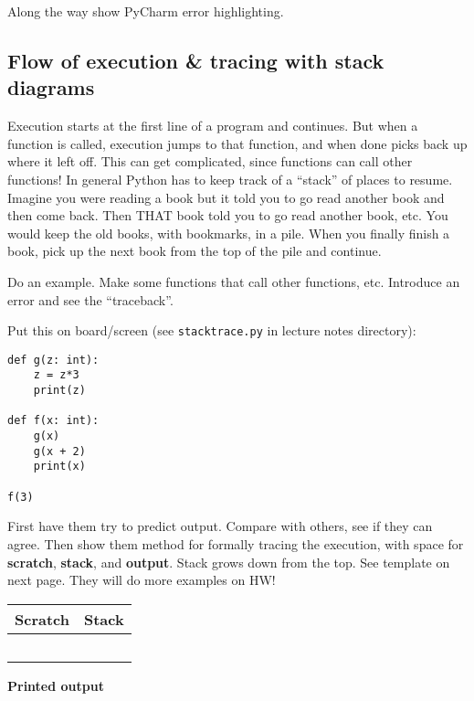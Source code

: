 \documentclass{article}
\begin{document}
Along the way show PyCharm error highlighting.

\subsection*{Flow of execution \& tracing with stack diagrams}

Execution starts at the first line of a program and continues.  But
when a function is called, execution jumps to that function, and when
done picks back up where it left off.  This can get complicated, since
functions can call other functions!  In general Python has to keep
track of a ``stack'' of places to resume.  Imagine you were reading a
book but it told you to go read another book and then come back.  Then
THAT book told you to go read another book, etc.  You would keep the
old books, with bookmarks, in a pile.  When you finally finish a book,
pick up the next book from the top of the pile and continue.

Do an example. Make some functions that call other functions,
etc. Introduce an error and see the ``traceback''.

Put this on board/screen (see \texttt{stacktrace.py} in lecture notes
directory):
\begin{verbatim}
def g(z: int):
    z = z*3
    print(z)

def f(x: int):
    g(x)
    g(x + 2)
    print(x)

f(3)
\end{verbatim}
First have them try to predict output.  Compare with others, see if
they can agree.  Then show them method for formally tracing the
execution, with space for \textbf{scratch}, \textbf{stack}, and
\textbf{output}.  Stack grows down from the top.  See template on next page.
They will do more examples on HW!

\newpage
\noindent
  \begin{tabular}{| >{\centering\bfseries}p{2.8in} | >{\centering\arraybackslash\bfseries}p{2.8in} |}
    \hline
    Scratch & Stack \\
    \hline & \\[1in]
    \cline{2-2} & \\[1in]
    \cline{2-2} & \\[1in]
    \cline{2-2} & \\[1in]
    \cline{2-2} & \\[1in]
    \hline
  \end{tabular} \bigskip

  \noindent \textbf{Printed output}
\end{document}
